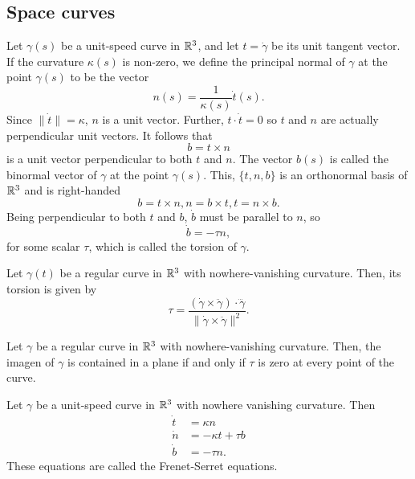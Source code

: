 \subsection{Space curves}

Let $\gamma(s)$ be a unit-speed curve in $\mathbb{R}^3$, and let
$t = \dot{\gamma}$ be its unit tangent vector.
If the curvature $\kappa(s)$ is non-zero, we define the principal normal of $\gamma$
at the point $\gamma(s)$ to be the vector
\[
  n(s) = \frac{1}{\kappa(s)} \dot{t}(s).
\]
Since $\|\dot{t}\| = \kappa$, $n$ is a unit vector.
Further, $t \cdot \dot{t} = 0$ so $t$ and $n$ are actually perpendicular unit vectors.
It follows that
\[
  b = t \times n  
\]
is a unit vector perpendicular to both $t$ and $n$.
The vector $b(s)$ is called the binormal vector of $\gamma$ at the point $\gamma(s)$.
This, $\{t, n, b\}$ is an orthonormal basis of $\mathbb{R}^3$ and is right-handed
\[
  b = t \times n, n = b \times t, t = n \times b.  
\]
Being perpendicular to both $t$ and $b$, $\dot{b}$ must be parallel to $n$, so
\[
  \dot{b} = -\tau n,
\]
for some scalar $\tau$, which is called the torsion of $\gamma$.

\begin{proposition}
  Let $\gamma(t)$ be a regular curve in $\mathbb{R}^3$ with nowhere-vanishing curvature.
  Then, its torsion is given by
  \[
    \tau = \frac{
      (\dot{\gamma} \times \ddot{\gamma}) \cdot \dddot{\gamma}
    }{
      \|\dot{\gamma} \times \ddot{\gamma}\|^2
    }.
  \]
\end{proposition}


\begin{proposition}
  Let $\gamma$ be a regular curve in $\mathbb{R}^3$ with nowhere-vanishing curvature.
  Then, the imagen of $\gamma$ is contained in a plane if and only if $\tau$ is zero at every point of the curve.
\end{proposition}

\begin{theorem}
  Let $\gamma$ be a unit-speed curve in $\mathbb{R}^3$ with nowhere vanishing curvature. Then
  \begin{align*}
    \dot{t} &= \kappa n \\
    \dot{n} &= -\kappa t + \tau b \\
    \dot{b} &= - \tau n.
  \end{align*}
  These equations are called the Frenet-Serret equations.
\end{theorem}

